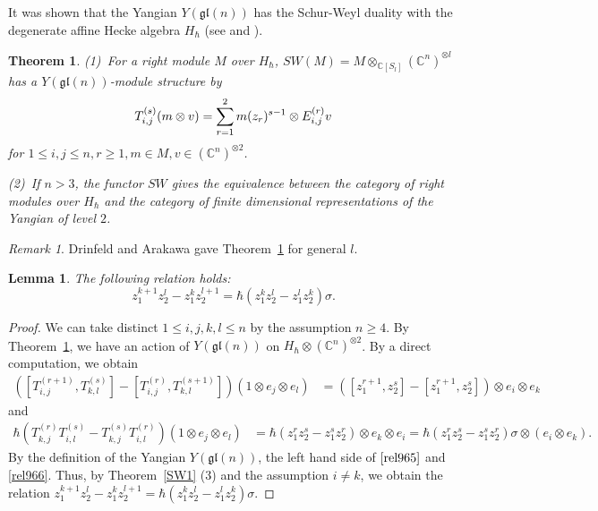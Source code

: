 \documentclass{article}
\newtheorem{Theorem}[equation]{Theorem}
\newtheorem{Lemma}[equation]{Lemma}
\theoremstyle{definition}
\theoremstyle{remark}
\newtheorem{Remark}[equation]{Remark}
\numberwithin{equation}{section}
\numberwithin{equation}{section}
\begin{document}
It was shown that the Yangian $Y(\mathfrak{gl}(n))$ has the Schur-Weyl duality with the degenerate affine Hecke algebra $H_\hbar$ (see \cite{Dri} and \cite{ara}). 
\begin{Theorem}\label{Thm137}
\textup{(1)}\ For a right module $M$ over $H_\hbar$, $SW(M)=M\otimes_{\mathbb{C}[S_l]}(\mathbb{C}^n)^{\otimes l}$ has a $Y(\mathfrak{gl}(n))$-module structure by
\[
T^{(s)}_{i,j}(m\otimes v)=\sum_{r=1}^2\limits m(z_r)^{s-1}\otimes E^{(r)}_{i,j}v
\]
for $1\leq i,j\leq n,r\geq1,m\in M,v\in(\mathbb{C}^n)^{\otimes2}$.

\textup{(2)}\ If $n>3$, the functor $SW$ gives the equivalence between the category of right modules over $H_\hbar$ and the category of finite dimensional representations of the Yangian of level $2$.
\end{Theorem}
\begin{Remark}
Drinfeld \cite{Dri} and Arakawa \cite{ara} gave Theorem~\ref{Thm137} for general $l$.
\end{Remark}
\begin{Lemma}\label{Lem128}
The following relation holds:
\[
z_1^{k+1}z_2^l-z_1^kz_2^{l+1}=\hbar(z_1^kz_2^l-z_1^lz_2^k)\sigma.
\]
\end{Lemma}
\begin{proof}
We can take distinct $1\leq i,j,k,l\leq n$ by the assumption $n\geq4$. By Theorem~\ref{Thm137}, we have an action of $Y(\mathfrak{gl}(n))$ on $H_\hbar\otimes(\mathbb{C}^n)^{\otimes2}$. By a direct computation, we obtain
\begin{align}
([T^{(r+1)}_{i,j},T^{(s)}_{k,l}]-[T^{(r)}_{i,j},T^{(s+1)}_{k,l}])(1\otimes e_j\otimes e_l)
&=([z_1^{r+1},z_2^s]-[z_1^{r+1},z_2^s])\otimes e_i\otimes e_k\label{rel965}
\end{align}
and
\begin{align}
\hbar(T^{(r)}_{k,j}T^{(s)}_{i,l}-T^{(s)}_{k,j}T^{(r)}_{i,l})(1\otimes e_j\otimes e_l)
&=\hbar(z_1^{r}z_2^s-z_1^sz_2^r)\otimes e_k\otimes e_i=\hbar(z_1^{r}z_2^s-z_1^sz_2^r)\sigma\otimes (e_i\otimes e_k)\label{rel966}.
\end{align}
By the definition of the Yangian $Y(\mathfrak{gl}(n))$, the left hand side of $\eqref{rel965}$ and \eqref{rel966}.
Thus, by Theorem~\ref{SW1} (3) and the assumption $i\neq k$, we obtain the relation $z_1^{k+1}z_2^l-z_1^kz_2^{l+1}=\hbar(z_1^kz_2^l-z_1^lz_2^k)\sigma$.
\end{proof}
\end{document}

